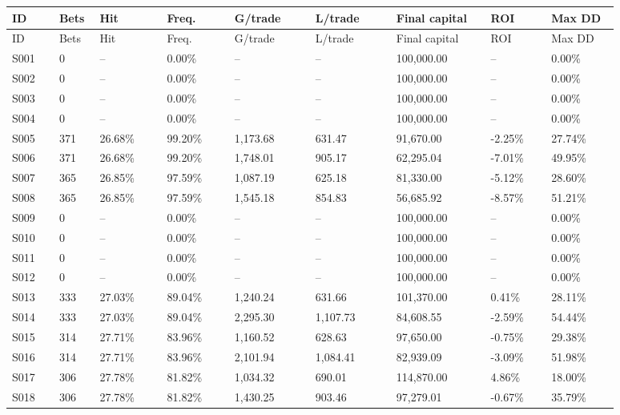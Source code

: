 \begin{longtable}{@{}p{0.07\linewidth}p{0.06\linewidth}p{0.1\linewidth}p{0.1\linewidth}p{0.12\linewidth}p{0.12\linewidth}p{0.14\linewidth}p{0.09\linewidth}p{0.1\linewidth}@{}}
\toprule
ID & Bets & Hit & Freq. & G/trade & L/trade & Final capital & ROI & Max DD \\

\midrule
\endfirsthead
\toprule
ID & Bets & Hit & Freq. & G/trade & L/trade & Final capital & ROI & Max DD \\

\midrule
\endhead
S001 & 0 & -- & 0.00\% & -- & -- & 100,000.00 & -- & 0.00\% \\
S002 & 0 & -- & 0.00\% & -- & -- & 100,000.00 & -- & 0.00\% \\
S003 & 0 & -- & 0.00\% & -- & -- & 100,000.00 & -- & 0.00\% \\
S004 & 0 & -- & 0.00\% & -- & -- & 100,000.00 & -- & 0.00\% \\
S005 & 371 & 26.68\% & 99.20\% & 1,173.68 & 631.47 & 91,670.00 & -2.25\% & 27.74\% \\
S006 & 371 & 26.68\% & 99.20\% & 1,748.01 & 905.17 & 62,295.04 & -7.01\% & 49.95\% \\
S007 & 365 & 26.85\% & 97.59\% & 1,087.19 & 625.18 & 81,330.00 & -5.12\% & 28.60\% \\
S008 & 365 & 26.85\% & 97.59\% & 1,545.18 & 854.83 & 56,685.92 & -8.57\% & 51.21\% \\
S009 & 0 & -- & 0.00\% & -- & -- & 100,000.00 & -- & 0.00\% \\
S010 & 0 & -- & 0.00\% & -- & -- & 100,000.00 & -- & 0.00\% \\
S011 & 0 & -- & 0.00\% & -- & -- & 100,000.00 & -- & 0.00\% \\
S012 & 0 & -- & 0.00\% & -- & -- & 100,000.00 & -- & 0.00\% \\
S013 & 333 & 27.03\% & 89.04\% & 1,240.24 & 631.66 & 101,370.00 & 0.41\% & 28.11\% \\
S014 & 333 & 27.03\% & 89.04\% & 2,295.30 & 1,107.73 & 84,608.55 & -2.59\% & 54.44\% \\
S015 & 314 & 27.71\% & 83.96\% & 1,160.52 & 628.63 & 97,650.00 & -0.75\% & 29.38\% \\
S016 & 314 & 27.71\% & 83.96\% & 2,101.94 & 1,084.41 & 82,939.09 & -3.09\% & 51.98\% \\
S017 & 306 & 27.78\% & 81.82\% & 1,034.32 & 690.01 & 114,870.00 & 4.86\% & 18.00\% \\
S018 & 306 & 27.78\% & 81.82\% & 1,430.25 & 903.46 & 97,279.01 & -0.67\% & 35.79\% \\

\end{longtable}
